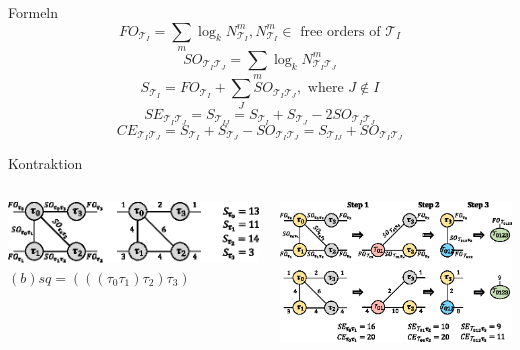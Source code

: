 \documentclass{beamer}
\newcommand{\Tau}{\mathcal{T}}
\begin{document}
\begin{frame}{Formeln}
	\begin{equation}
		FO_{\Tau_I}=\sum\limits_m \log_k N_{\Tau_I}^m, N_{\Tau_I}^m \in \text{ free orders of } \Tau_I
	\end{equation}
	\begin{equation}
		SO_{\Tau_I\Tau_J}=\sum\limits_m \log_k N_{\Tau_I\Tau_J}^m
	\end{equation}
	\begin{equation}
		S_{\Tau_I}=FO_{\Tau_I}+\sum\limits_J SO_{\Tau_I\Tau_J}, \text{ where } J\notin I
	\end{equation}
	\begin{equation}
		SE_{\Tau_I\Tau_J}=S_{\Tau_{IJ}}=S_{\Tau_I}+S_{\Tau_J}-2SO_{\Tau_I\Tau_J}
	\end{equation}
	\begin{equation}
		CE_{\Tau_I\Tau_J}=S_{\Tau_I}+S_{\Tau_J}-SO_{\Tau_I\Tau_J}=S_{\Tau_{IJ}}+SO_{\Tau_I\Tau_J}
	\end{equation}
\end{frame}

\begin{frame}{Kontraktion}
	\begin{columns}
		\begin{column}{0.5\textwidth}
			\includegraphics[scale=.17]{figure_03_a}
			$(b) sq=(((\tau_0\tau_1)\tau_2)\tau_3)$
		\end{column}
		\begin{column}{0.5\textwidth}
			\includegraphics[scale=.17]{figure_03_b}
		\end{column}
	\end{columns}
\end{frame}
\end{document}
